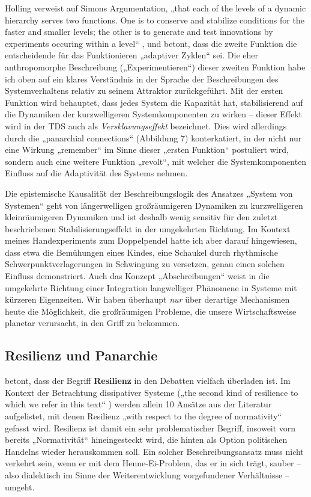 \documentclass[11pt,a4paper]{article}
\begin{document}
Holling verweist auf Simons Argumentation, „that each of the levels of a
dynamic hierarchy serves two functions. One is to conserve and stabilize
conditions for the faster and smaller levels; the other is to generate and
test innovations by experiments occuring within a level“
\cite[S. 393]{Holling2000}, und betont, dass die zweite Funktion die
entscheidende für das Funktionieren „adaptiver Zyklen“ sei. Die eher
anthropomorphe Beschreibung („Experimentieren“) dieser zweiten Funktion habe
ich oben auf ein klares Verständnis in der Sprache der Beschreibungen des
Systemverhaltens relativ zu seinem Attraktor zurückgeführt. Mit der ersten
Funktion wird behauptet, dass jedes System die Kapazität hat, stabilisierend
auf die Dynamiken der kurzwelligeren Systemkomponenten zu wirken -- dieser
Effekt wird in der TDS auch als \emph{Versklavungseffekt} bezeichnet. Dies
wird allerdings durch die „panarchial connections“ (Abbildung 7)
konterkatiert, in der nicht nur eine Wirkung „remember“ im Sinne dieser
„ersten Funktion“ postuliert wird, sondern auch eine weitere Funktion
„revolt“, mit welcher die Systemkomponenten Einfluss auf die Adaptivität des
Systems nehmen.

Die epistemische Kausalität der Beschreibungslogik des Ansatzes „System von
Systemen“ geht von längerwelligen großräumigeren Dynamiken zu kurzwelligeren
kleinräumigeren Dynamiken und ist deshalb wenig sensitiv für den zuletzt
beschriebenen Stabilisierungseffekt in der umgekehrten Richtung. Im Kontext
meines Handexperiments zum Doppelpendel hatte ich aber darauf hingewiesen,
dass etwa die Bemühungen eines Kindes, eine Schaukel durch rhythmische
Schwerpunktverlagerungen in Schwingung zu versetzen, genau einen solchen
Einfluss demonstriert. Auch das Konzept „Abschreibungen“ weist in die
umgekehrte Richtung einer Integration langwelliger Phänomene in Systeme mit
kürzeren Eigenzeiten. Wir haben überhaupt \emph{nur} über derartige
Mechanismen heute die Möglichkeit, die großräumigen Probleme, die unsere
Wirtschaftsweise planetar verursacht, in den Griff zu bekommen.

\subsection{Resilienz und Panarchie}

\cite{Brand2007} betont, dass der Begriff \textbf{Resilienz} in den Debatten
vielfach überladen ist. Im Kontext der Betrachtung dissipativer Systeme („the
second kind of resilience to which we refer in this text“ \cite{Brand2007})
werden allein 10 Ansätze aus der Literatur aufgelistet, mit denen Resilienz
„with respect to the degree of normativity“ gefasst wird. Resilienz ist damit
ein sehr problematischer Begriff, insoweit vorn bereits „Normativität“
hineingesteckt wird, die hinten als Option politischen Handelns wieder
herauskommen soll. Ein solcher Beschreibungsansatz muss nicht verkehrt sein,
wenn er mit dem Henne-Ei-Problem, das er in sich trägt, sauber -- also
dialektisch im Sinne der Weiterentwicklung vorgefundener Verhältnisse --
umgeht.
\end{document}
